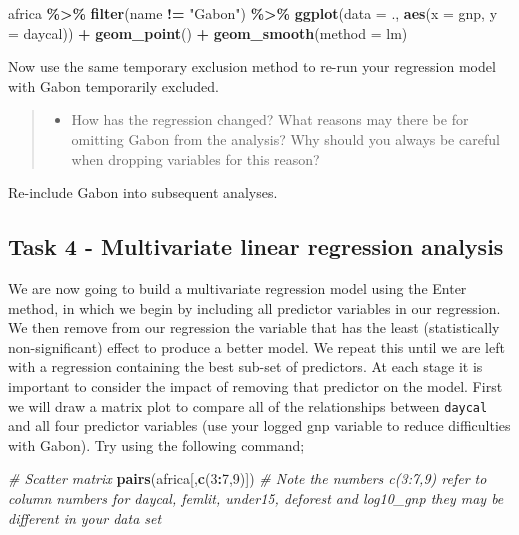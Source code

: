 \documentclass[
]{book}
\newenvironment{Shaded}{\begin{snugshade}}{\end{snugshade}}
\newcommand{\AttributeTok}[1]{\textcolor[rgb]{0.13,0.29,0.53}{#1}}
\newcommand{\CommentTok}[1]{\textcolor[rgb]{0.56,0.35,0.01}{\textit{#1}}}
\newcommand{\DecValTok}[1]{\textcolor[rgb]{0.00,0.00,0.81}{#1}}
\newcommand{\FunctionTok}[1]{\textcolor[rgb]{0.13,0.29,0.53}{\textbf{#1}}}
\newcommand{\NormalTok}[1]{#1}
\newcommand{\SpecialCharTok}[1]{\textcolor[rgb]{0.81,0.36,0.00}{\textbf{#1}}}
\newcommand{\StringTok}[1]{\textcolor[rgb]{0.31,0.60,0.02}{#1}}
\providecommand{\tightlist}{%
  \setlength{\itemsep}{0pt}\setlength{\parskip}{0pt}}
\begin{document}
\begin{Shaded}
\begin{Highlighting}[]
\NormalTok{africa }\SpecialCharTok{\%\textgreater{}\%}
  \FunctionTok{filter}\NormalTok{(name }\SpecialCharTok{!=} \StringTok{"Gabon"}\NormalTok{) }\SpecialCharTok{\%\textgreater{}\%}
  \FunctionTok{ggplot}\NormalTok{(}\AttributeTok{data =}\NormalTok{ ., }\FunctionTok{aes}\NormalTok{(}\AttributeTok{x =}\NormalTok{ gnp, }\AttributeTok{y =}\NormalTok{ daycal)) }\SpecialCharTok{+}
  \FunctionTok{geom\_point}\NormalTok{() }\SpecialCharTok{+}
  \FunctionTok{geom\_smooth}\NormalTok{(}\AttributeTok{method =}\NormalTok{ lm)}
\end{Highlighting}
\end{Shaded}

Now use the same temporary exclusion method to re-run your regression model with Gabon temporarily excluded.

\begin{quote}
\begin{itemize}
\tightlist
\item
  How has the regression changed? What reasons may there be for omitting Gabon from the analysis? Why should you always be careful when dropping variables for this reason?
\end{itemize}
\end{quote}

Re-include Gabon into subsequent analyses.

\hypertarget{c11t4}{%
\subsection{Task 4 - Multivariate linear regression analysis}\label{c11t4}}

We are now going to build a multivariate regression model using the Enter method, in which we begin by including all predictor variables in our regression. We then remove from our regression the variable that has the least (statistically non-significant) effect to produce a better model. We repeat this until we are left with a regression containing the best sub-set of predictors. At each stage it is important to consider the impact of removing that predictor on the model.
First we will draw a matrix plot to compare all of the relationships between \texttt{daycal} and all four predictor variables (use your logged gnp variable to reduce difficulties with Gabon). Try using the following command;

\begin{Shaded}
\begin{Highlighting}[]
\CommentTok{\# Scatter matrix}
\FunctionTok{pairs}\NormalTok{(africa[,}\FunctionTok{c}\NormalTok{(}\DecValTok{3}\SpecialCharTok{:}\DecValTok{7}\NormalTok{,}\DecValTok{9}\NormalTok{)])}
\CommentTok{\# Note the numbers c(3:7,9) refer to column numbers for daycal, femlit, under15, deforest and log10\_gnp they may be different in your data set}
\end{Highlighting}
\end{Shaded}
\end{document}
